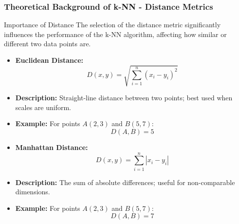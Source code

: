 \documentclass[aspectratio=169]{beamer}
\begin{document}
\begin{frame}[fragile]
    \frametitle{Theoretical Background of k-NN - Distance Metrics}
    \begin{block}{Importance of Distance}
        The selection of the distance metric significantly influences the performance of the k-NN algorithm, affecting how similar or different two data points are.
    \end{block}
    
    \begin{itemize}
        \item \textbf{Euclidean Distance:} 
        \begin{equation}
            D(x, y) = \sqrt{\sum_{i=1}^{n} (x_i - y_i)^2}
        \end{equation}
        \item \textbf{Description:} Straight-line distance between two points; best used when scales are uniform.
        \item \textbf{Example:} For points \( A(2, 3) \) and \( B(5, 7) \):
        \begin{equation}
            D(A, B) = 5
        \end{equation}
        
        \item \textbf{Manhattan Distance:} 
        \begin{equation}
            D(x, y) = \sum_{i=1}^{n} |x_i - y_i|
        \end{equation}
        \item \textbf{Description:} The sum of absolute differences; useful for non-comparable dimensions.
        \item \textbf{Example:} For points \( A(2, 3) \) and \( B(5, 7) \):
        \begin{equation}
            D(A, B) = 7
        \end{equation}
    \end{itemize}
\end{frame}
\end{document}
